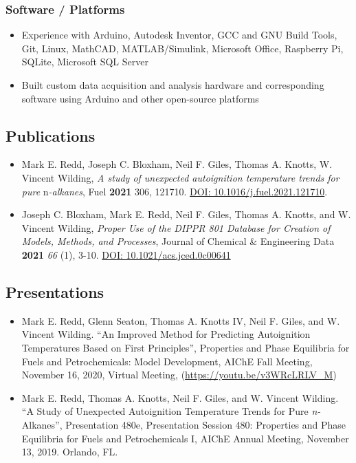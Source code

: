 \hypertarget{software-platforms}{%
\subsubsection{Software / Platforms}\label{software-platforms}}

\begin{itemize}
\tightlist
\item
  Experience with Arduino, Autodesk Inventor, GCC and GNU Build Tools,
  Git, Linux, MathCAD, MATLAB/Simulink, Microsoft Office, Raspberry Pi,
  SQLite, Microsoft SQL Server
\item
  Built custom data acquisition and analysis hardware and corresponding
  software using Arduino and other open-source platforms
\end{itemize}

\hypertarget{publications}{%
\subsection{Publications}\label{publications}}


\begin{itemize}
\tightlist
\item
  Mark E. Redd, Joseph C. Bloxham, Neil F. Giles, Thomas A. Knotts, W.
  Vincent Wilding, \emph{A study of unexpected autoignition temperature
  trends for pure} n\emph{-alkanes}, Fuel \textbf{2021} 306, 121710.
  \href{https://doi.org/10.1016/j.fuel.2021.121710}{DOI:
  10.1016/j.fuel.2021.121710}.
\item
  Joseph C. Bloxham, Mark E. Redd, Neil F. Giles, Thomas A. Knotts, and
  W. Vincent Wilding, \emph{Proper Use of the DIPPR 801 Database for
  Creation of Models, Methods, and Processes}, Journal of Chemical \&
  Engineering Data \textbf{2021} \emph{66} (1), 3-10.
  \href{https://doi.org/10.1021/acs.jced.0c00641}{DOI:
  10.1021/acs.jced.0c00641}
\end{itemize}

\hypertarget{presentations}{%
\subsection{Presentations}\label{presentations}}

\begin{itemize}
\tightlist
\item
  Mark E. Redd, Glenn Seaton, Thomas A. Knotts IV, Neil F. Giles, and W.
  Vincent Wilding. ``An Improved Method for Predicting Autoignition
  Temperatures Based on First Principles'', Properties and Phase
  Equilibria for Fuels and Petrochemicals: Model Development, AIChE Fall
  Meeting, November 16, 2020, Virtual Meeting,
  (\url{https://youtu.be/v3WRcLRLV_M})
\item
  Mark E. Redd, Thomas A. Knotts, Neil F. Giles, and W. Vincent Wilding.
  ``A Study of Unexpected Autoignition Temperature Trends for Pure
  \emph{n-}Alkanes'', Presentation 480e, Presentation Session 480:
  Properties and Phase Equilibria for Fuels and Petrochemicals I, AIChE
  Annual Meeting, November 13, 2019. Orlando, FL.
\end{itemize}
